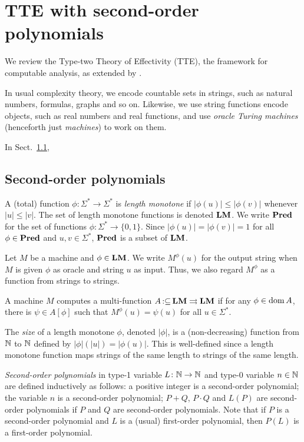 \documentclass[envcountsame,orivec,oribibl]{llncs}
\newcommand{\pcolon}{\mathpunct{\,:\subseteq}}
\begin{document}
\section{TTE with second-order polynomials}
\label{section: computable analysis}

We review the Type-two Theory of Effectivity (TTE), 
the framework for computable analysis, 
as extended by 
\cite{kawamura2012complexity}. 

In usual complexity theory, we encode countable sets in strings, such as
natural numbers, formulas, graphs and so on. 
Likewise, 
we use string functions encode objects, such as real numbers and real functions, 
and use \emph{oracle Turing machines} (henceforth just \emph{machines}) 
to work on them.

In Sect.~\ref{section:TTF}, 

\subsection{Second-order polynomials}
\label{section:TTF}

A (total) function $\phi \colon \Sigma^* \to \Sigma^*$ is \emph{length monotone}
if $|\phi(u)| \le |\phi(v)|$ whenever $|u| \le |v|$.
The set of length monotone functions is denoted $\mathbf{LM}$.
We write $\mathbf{Pred}$ for the set of functions $\phi \colon \Sigma^* \to \{0, 1\}$.
Since $|\phi(u)| = |\phi(v)| = 1$ for all $\phi \in \mathbf{Pred}$ and $u, v \in \Sigma^*$,
$\mathbf{Pred}$ is a subset of $\mathbf{LM}$.

Let $M$ be a machine and $\phi \in \mathbf{LM}$. 
We write $M ^\phi (u)$ for the output string 
when $M$ is given
$\phi$ as oracle and string $u$ as input.
Thus, we also regard $M^\phi$ as a function from strings to strings.

\begin{definition}
 A machine $M$ computes a multi-function $A \pcolon \LM \rightrightarrows \LM$ if for any
 $\phi \in \mathop{\rm dom} A$, there is $\psi \in A[\phi]$ such that $M^\phi(u) = \psi(u)$ for all $u \in \Sigma^*$.
\end{definition}

The \emph{size} of a length monotone $\phi$, denoted $|\phi|$,
is a (non-decreasing) function from $\mathbb N$ to $\mathbb N$ defined by 
$|\phi|(|u|) = |\phi(u)|$.
This is well-defined since a length monotone function maps 
strings of the same length to strings of the same length.

\emph{Second-order polynomials} in type-1 variable $L \colon \mathbb N \to \mathbb N$
and type-0 variable $n \in \mathbb N$ 
are defined inductively as follows:
a positive integer is a second-order polynomial;
the variable $n$ is a second-order polynomial;
$P+Q$, $P \cdot Q$ and $L(P)$ are
second-order polynomials if $P$ and $Q$ are second-order polynomials.
Note that if $P$ is a second-order polynomial and $L$ is a (usual) first-order
polynomial, then $P(L)$ is a first-order polynomial.
\end{document}
